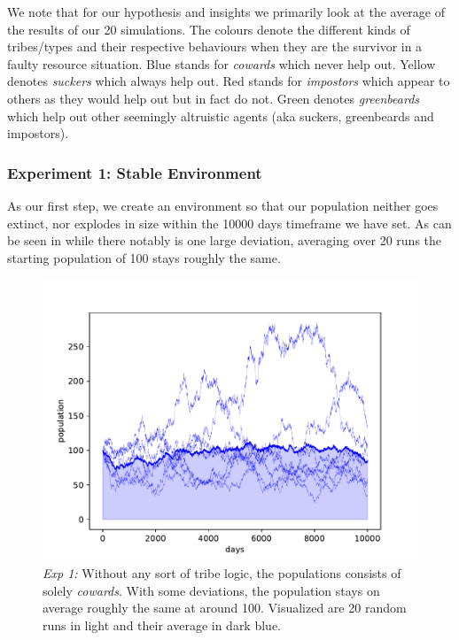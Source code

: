 \documentclass[sigconf]{acmart}
\newcommand{\todo}[1]{{\color{red}{#1}}}
\newcommand{\VNumSimulations}{20\xspace}
\newcommand{\VNumDays}{10000\xspace}
\newcommand{\VNumPop}{100\xspace}
\newcommand{\cowards}{\textit{cowards}\xspace}
\newcommand{\suckers}{\textit{suckers}\xspace}
\newcommand{\impostors}{\textit{impostors}\xspace}
\newcommand{\greenbeards}{\textit{greenbeards}\xspace}
\begin{document}
    We note that for our hypothesis and insights we primarily look at the average of the results of our \VNumSimulations simulations.
    The colours denote the different kinds of tribes/types and their respective behaviours when they are the survivor in a faulty resource situation.
    Blue stands for \cowards which never help out.
    Yellow denotes \suckers which always help out.
    Red stands for \impostors which appear to others as they would help out but in fact do not.
    Green denotes \greenbeards which help out other seemingly altruistic agents (aka suckers, greenbeards and impostors).

    \subsubsection*{Experiment 1: Stable Environment}
    As our first step, we create an environment so that our population neither goes extinct, nor explodes in size within the \VNumDays days timeframe we have set.
    \todo{This acts as a comparison for the quality of further experiments.}
    As can be seen in  while there notably is one large deviation, averaging over \VNumSimulations runs the starting population of 100 stays roughly the same.

    \begin{figure}
        \includegraphics[width=\columnwidth]{figures/stable_population}
        \caption{\textit{Exp 1:} Without any sort of tribe logic, the populations consists of solely \cowards.
        With some deviations, the population stays on average roughly the same at around \VNumPop.
        Visualized are \VNumSimulations random runs in light and their average in dark blue. }
        \label{fig:stable_pop}
    \end{figure}
\end{document}
